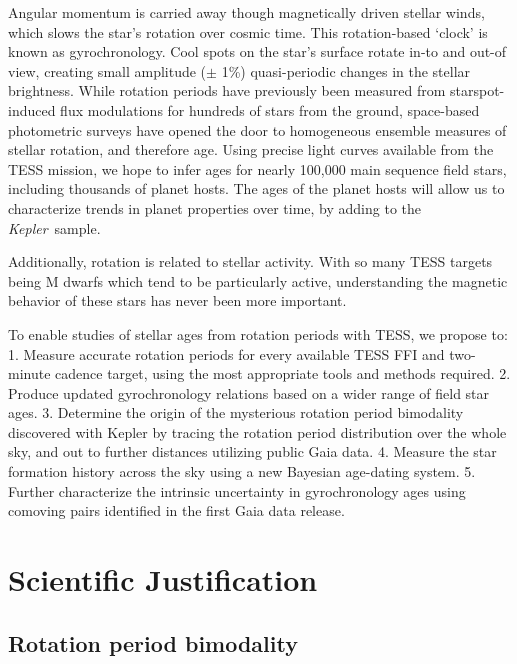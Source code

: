 \documentclass[useAMS, usenatbib, preprint, 12pt]{aastex}
\newcommand{\Kepler}{{\it Kepler}}
\newcommand{\kepler}{\Kepler}
\begin{document}
Angular momentum is carried away though magnetically driven stellar winds,
which slows the star’s rotation over cosmic time. This rotation-based `clock'
is known as gyrochronology.
Cool spots on the star’s surface rotate in-to and out-of view, creating small
amplitude ($\pm$ 1\%) quasi-periodic changes in the stellar brightness.
While rotation periods have previously been measured from starspot-induced
flux modulations for hundreds of stars from the ground, space-based
photometric surveys have opened the door to homogeneous ensemble measures of
stellar rotation, and therefore age.
Using precise light curves available from the TESS mission, we hope to
infer ages for nearly 100,000 main sequence field stars, including thousands
of planet hosts.
The ages of the planet hosts will allow us to characterize trends in planet
properties over time, by adding to the \kepler\ sample.

Additionally, rotation is related to stellar activity.
With so many TESS targets being M dwarfs which tend to be particularly active,
understanding the magnetic behavior of these stars has never been more
important.

To enable studies of stellar ages from rotation periods with TESS, we propose
to: 1. Measure accurate rotation periods for every available TESS FFI and
two-minute cadence target, using the most appropriate tools and methods
required.
2. Produce updated gyrochronology relations based on a wider range of field
star ages.
3. Determine the origin of the mysterious rotation period bimodality
discovered with Kepler by tracing the rotation period distribution over the
whole sky, and out to further distances utilizing public Gaia data.
4. Measure the star formation history across the sky using a new Bayesian
age-dating system.
5. Further characterize the intrinsic uncertainty in gyrochronology ages using
comoving pairs identified in the first Gaia data release.

\section{Scientific Justification}
\subsection{Rotation period bimodality}
\end{document}
